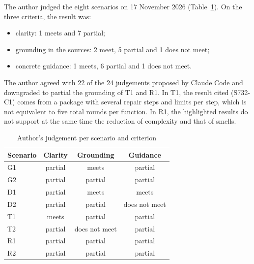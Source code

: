 The author judged the eight scenarios on 17 November 2026 (Table~\ref{tab:julgamento}). On the three criteria, the result was:
\begin{itemize}
  \item clarity: 1 meets and 7 partial;
  \item grounding in the sources: 2 meet, 5 partial and 1 does not meet;
  \item concrete guidance: 1 meets, 6 partial and 1 does not meet.
\end{itemize}
The author agreed with 22 of the 24 judgements proposed by Claude Code and downgraded to partial the grounding of
T1 and R1. In T1, the result cited (S732-C1) comes from a package with several repair steps and limits per step, which
is not equivalent to five total rounds per function. In R1, the highlighted results do not support at the same time the
reduction of complexity and that of smells.

\begin{table}[!t]
\caption{Author's judgement per scenario and criterion}\label{tab:julgamento}
\centering\scriptsize
\begin{tabular}{@{}lccc@{}}
\hline
Scenario & Clarity & Grounding & Guidance\\
\hline
G1 & partial & meets & partial\\
G2 & partial & partial & partial\\
D1 & partial & meets & meets\\
D2 & partial & partial & does not meet\\
T1 & meets & partial & partial\\
T2 & partial & does not meet & partial\\
R1 & partial & partial & partial\\
R2 & partial & partial & partial\\
\hline
\end{tabular}
\end{table}

